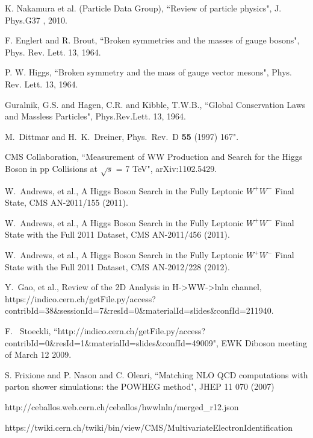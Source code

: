 \clearpage

\vspace*{-0.2cm}

 K. Nakamura et al. (Particle Data Group), ``Review of particle physics", J. Phys.G37 , 2010.

F. Englert and R. Brout, ``Broken symmetries and the masses of gauge bosons", Phys. Rev. Lett. 13,  1964.

P. W. Higgs, ``Broken symmetry and the mass of gauge vector mesons", Phys. Rev. Lett. 13, 1964.

Guralnik, G.S. and Hagen, C.R. and Kibble, T.W.B., ``Global Conservation Laws and Massless Particles", 
Phys.Rev.Lett. 13, 1964.

M.~Dittmar and H.~K.~Dreiner, Phys.\ Rev.\  D {\bf 55} (1997) 167".

CMS Collaboration, ``Measurement of WW Production and Search for the Higgs Boson in 
pp Collisions at $\sqrt{s}$ = 7 TeV", arXiv:1102.5429.

W.~Andrews, et al., A Higgs Boson Search in the Fully Leptonic $W^+W^-$ Final State, CMS AN-2011/155 (2011).

W.~Andrews, et al., A Higgs Boson Search in the Fully Leptonic $W^+W^-$ Final State with the Full 2011 Dataset, CMS AN-2011/456 (2011).

W.~Andrews, et al., A Higgs Boson Search in the Fully Leptonic $W^+W^-$ Final State with the Full 2011 Dataset, CMS AN-2012/228 (2012).

Y.~Gao, et al., Review of the 2D Analysis in H->WW->lnln channel,
https://indico.cern.ch/getFile.py/access?contribId=38\&sessionId=7\&resId=0\&materialId=slides\&confId=211940.

F.~ Stoeckli, ``http://indico.cern.ch/getFile.py/access?contribId=0\&resId=1\&materialId=slides\&confId=49009", 
EWK Diboson meeting of March 12 2009.

S. Frixione and P. Nason and C. Oleari, 
``Matching {NLO QCD} computations with parton shower simulations: the {POWHEG} method",
  JHEP 11 070 (2007)

http://ceballos.web.cern.ch/ceballos/hwwlnln/merged\_r12.json

https://twiki.cern.ch/twiki/bin/view/CMS/MultivariateElectronIdentification


